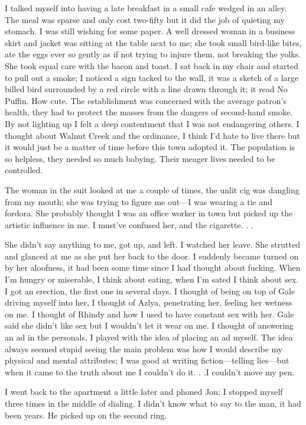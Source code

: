 I talked myself into having a late breakfast in a small cafe wedged in
an alley. The meal was sparse and only cost two-fifty but it did the job
of quieting my stomach. I was still wishing for some paper. A well
dressed woman in a business skirt and jacket was sitting at the table
next to me; she took small bird-like bites, ate the eggs ever so gently
as if not trying to injure them, not breaking the yolks. She took equal
care with the bacon and toast. I sat back in my chair and started to
pull out a smoke; I noticed a sign tacked to the wall, it was a sketch
of a large billed bird surrounded by a red circle with a line drawn
through it; it read No Puffin. How cute. The establishment was concerned
with the average patron's health, they had to protect the masses from
the dangers of second-hand smoke. By not lighting up I felt a deep
contentment that I was not endangering others. I thought about Walnut
Creek and the ordinance, I think I'd hate to live there but it would
just be a matter of time before this town adopted it. The population is
so helpless, they needed so much babying. Their meager lives needed to
be controlled.

The woman in the suit looked at me a couple of times, the unlit cig was
dangling from my mouth; she was trying to figure me out---I was wearing
a tie and fordora. She probably thought I was an office worker in town
but picked up the artistic influence in me. I must've confused her, and
the cigarette. . .

She didn't say anything to me, got up, and left. I watched her leave.
She strutted and glanced at me as she put her back to the door. I
suddenly became turned on by her aloofness, it had been some time since
I had thought about fucking. When I'm hungry or miserable, I think about
eating, when I'm sated I think about sex. I got an erection, the first
one in several days. I thought of being on top of Gale driving myself
into her, I thought of Azlya, penetrating her, feeling her wetness on
me. I thought of Rhindy and how I used to have constant sex with her.
Gale said she didn't like sex but I wouldn't let it wear on me. I
thought of answering an ad in the personals, I played with the idea of
placing an ad myself. The idea always seemed stupid seeing the main
problem was how I would describe my physical and mental attributes; I
was good at writing fiction---telling lies---but when it came to the
truth about me I couldn't do it. . .I couldn't move my pen.

I went back to the apartment a little later and phoned Jon; I stopped
myself three times in the middle of dialing. I didn't know what to say
to the man, it had been years. He picked up on the second ring.

